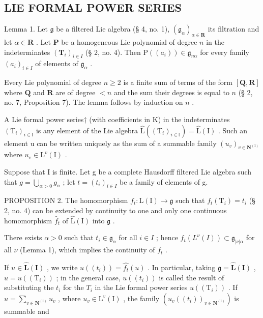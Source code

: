 \subsection{LIE FORMAL POWER SERIES}

Lemma 1. Let \(\mathfrak{g}\) be a filtered Lie algebra (§ 4, no. 1), \((\mathfrak{g}_{\alpha})_{\alpha \in \mathbf{R}}\) its filtration and let \(\alpha \in \mathbf{R}\) . Let \(\mathbf{P}\) be a homogeneous Lie polynomial of degree \(n\) in the indeterminates \((\mathbf{T}_i)_{i \in I}\) (§ 2, no. 4). Then \(\mathrm{P}((a_i)) \in \mathfrak{g}_{n\alpha}\) for every family \((a_i)_{i \in I}\) of elements of \(\mathfrak{g}_{\alpha}\) .

Every Lie polynomial of degree \(n \geqslant 2\) is a finite sum of terms of the form \([\mathbf{Q}, \mathbf{R}]\) where \(\mathbf{Q}\) and \(\mathbf{R}\) are of degree \(< n\) and the sum their degrees is equal to \(n\) (§ 2, no. 7, Proposition 7). The lemma follows by induction on \(n\) .

A Lie formal power series† (with coefficients in K) in the indeterminates \((\mathrm{T}_{i})_{i\in\mathbb{I}}\) is any element of the Lie algebra \(\hat{\mathrm{L}}((\mathrm{T}_{i})_{i\in\mathbb{I}})=\hat{\mathrm{L}}(\mathrm{I})\) . Such an element u can be written uniquely as the sum of a summable family \((u_{v})_{v\in\mathbf{N}^{(\mathrm{I})}}\) where \(u_{v}\in\mathrm{L}^{v}(\mathrm{I})\) .

Suppose that I is finite. Let g be a complete Hausdorff filtered Lie algebra such that \(g = \bigcup_{\alpha > 0} g_{\alpha}\) ; let \(t = (t_i)_{i \in I}\) be a family of elements of g.

PROPOSITION 2. The homomorphism \(f_{t} \colon \mathrm{L}(\mathrm{I}) \to \mathfrak{g}\) such that \(f_{t}(\mathrm{T}_{i}) = t_{i}\) (§ 2, no. 4) can be extended by continuity to one and only one continuous homomorphism \(\hat{f}_{t}\) of \(\hat{\mathrm{L}}(\mathrm{I})\) into \(\mathfrak{g}\) .

There exists \(\alpha > 0\) such that \(t_i \in \mathfrak{g}_\alpha\) for all \(i \in I\) ; hence \(f_t(L^\nu(I)) \subset \mathfrak{g}_{|\nu| \alpha}\) for all \(\nu\) (Lemma 1), which implies the continuity of \(f_t\) .

If \(u \in \widehat{\mathbf{L}}(\mathbf{I})\) , we write \(u((t_i)) = \widehat{f_t}(u)\) . In particular, taking \(\mathfrak{g} = \widehat{\mathbf{L}}(\mathbf{I})\) , \(u = u((\mathrm{T}_i))\) ; in the general case, \(u((t_i))\) is called the result of substituting the \(t_i\) for the \(T_i\) in the Lie formal power series \(u((\mathrm{T}_i))\) . If \(u = \sum_{v \in \mathbf{N}^{(\mathrm{I})}} u_v\) , where \(u_v \in \mathrm{L}^v(\mathrm{I})\) , the family \((u_v((t_i))_{v \in \mathbf{N}^{(\mathrm{I})}})\) is summable and

